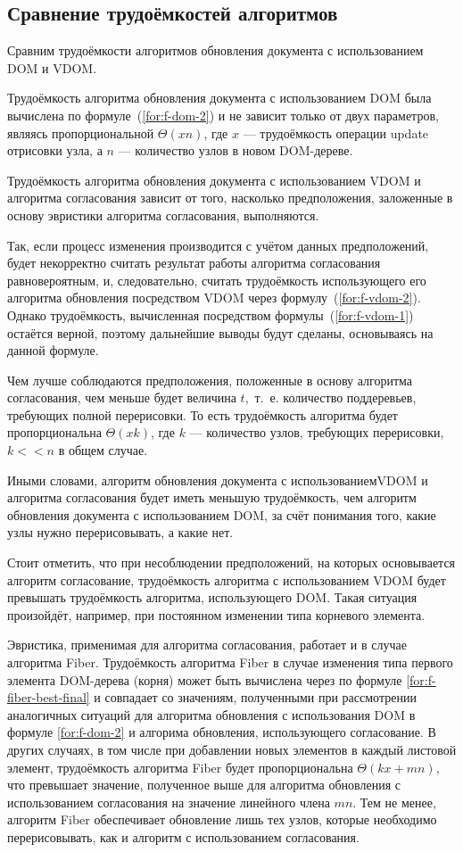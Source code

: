 \subsection{Сравнение трудоёмкостей алгоритмов}

Сравним трудоёмкости алгоритмов обновления документа с использованием DOM и VDOM.

Трудоёмкость алгоритма обновления документа с использованием DOM была вычислена по формуле~(\ref{for:f-dom-2}) и не зависит только от двух параметров, являясь пропорциональной $\Theta(xn)$, где $x$ --- трудоёмкость операции update отрисовки узла, а $n$ --- количество узлов в новом DOM-дереве.

Трудоёмкость алгоритма обновления документа с использованием VDOM и алгоритма согласования зависит от того, насколько предположения, заложенные в основу эвристики алгоритма согласования, выполняются.

Так, если процесс изменения производится с учётом данных предположений, будет некорректно считать результат работы алгоритма согласования равновероятным, и, следовательно, считать трудоёмкость использующего его алгоритма обновления посредством VDOM через формулу~(\ref{for:f-vdom-2}). 
Однако трудоёмкость, вычисленная посредством формулы~(\ref{for:f-vdom-1}) остаётся верной, поэтому дальнейшие выводы будут сделаны, основываясь на данной формуле.

Чем лучше соблюдаются предположения, положенные в основу алгоритма согласования, чем меньше будет величина $t$,~т.~е. количество поддеревьев, требующих полной перерисовки. 
То есть трудоёмкость алгоритма будет пропорциональна $\Theta(xk)$, где $k$ --- количество узлов, требующих перерисовки, $k << n$ в общем случае.

Иными словами, алгоритм обновления документа с использованием\break VDOM и алгоритма согласования будет иметь меньшую трудоёмкость, чем алгоритм обновления документа с использованием DOM, за счёт понимания того, какие узлы нужно перерисовывать, а какие нет.

Стоит отметить, что при несоблюдении предположений, на которых основывается алгоритм согласование, трудоёмкость алгоритма с использованием VDOM будет превышать трудоёмкость алгоритма, использующего DOM. 
Такая ситуация произойдёт, например, при постоянном изменении типа корневого элемента.

Эвристика, применимая для алгоритма согласования, работает и в случае алгоритма Fiber. Трудоёмкость алгоритма Fiber в случае изменения типа первого элемента DOM-дерева (корня) может быть вычислена через по формуле \ref{for:f-fiber-best-final} и совпадает со значениям, полученными при рассмотрении аналогичных ситуаций для алгоритма обновления с использования DOM в формуле \ref{for:f-dom-2} и алгорима обновления, использующего согласование. В других случаях, в том числе при добавлении новых  элементов в каждый листовой элемент, трудоёмкость алгоритма Fiber будет пропорциональна $\Theta(kx + mn)$, что превышает значение, полученное выше для алгоритма обновления с использованием согласования на значение линейного члена $mn$. Тем не менее, алгоритм Fiber обеспечивает обновление лишь тех узлов, которые необходимо перерисовывать, как и алгоритм с использованием согласования.

